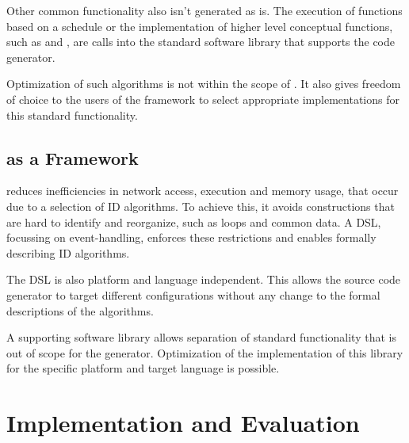 \documentclass[conference]{IEEEtran}
\begin{document}
Other common functionality also isn't generated as is. The execution of
functions based on a schedule or the implementation of higher level conceptual
functions, such as  and , are calls into the standard
software library that supports the code generator.

Optimization of such algorithms is not within the scope of \NAME. It also gives
freedom of choice to the users of the framework to select appropriate
implementations for this standard functionality.

\subsection{\NAME as a Framework}

\NAME reduces inefficiencies in network access, execution and memory usage,
that occur due to a selection of ID algorithms. To achieve this, it avoids
constructions that are hard to identify and reorganize, such as loops and
common data. A DSL, focussing on event-handling, enforces these restrictions
and enables formally describing ID algorithms.

The DSL is also platform and language independent. This allows the source code
generator to target different configurations without any change to the formal
descriptions of the algorithms.

A supporting software library allows separation of standard functionality that
is out of scope for the generator. Optimization of the implementation of this
library for the specific platform and target language is possible.

\section{Implementation and Evaluation}
\label{evaluation}
\end{document}
